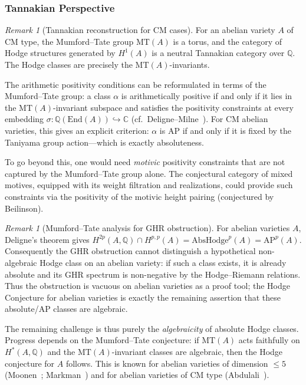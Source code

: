 \documentclass[aps,prd,twocolumn,superscriptaddress,nofootinbib]{revtex4-2}
\theoremstyle{definition}
\theoremstyle{remark}
\newtheorem{remark}[theorem]{Remark}
\begin{document}
\subsubsection{Tannakian Perspective}

\begin{remark}[Tannakian reconstruction for CM cases]
\label{rem:tannakian}
For an abelian variety $A$ of CM type, the Mumford--Tate group $\mathrm{MT}(A)$ is a torus, and the category of Hodge structures generated by $H^1(A)$ is a neutral Tannakian category over $\mathbb{Q}$. The Hodge classes are precisely the $\mathrm{MT}(A)$-invariants.

The arithmetic positivity conditions can be reformulated in terms of the Mumford--Tate group: a class $\alpha$ is arithmetically positive if and only if it lies in the $\mathrm{MT}(A)$-invariant subspace and satisfies the positivity constraints at every embedding $\sigma: \mathbb{Q}(\mathrm{End}(A)) \hookrightarrow \mathbb{C}$ (cf.\ Deligne--Milne~\cite{DeligneMilne1982}). For CM abelian varieties, this gives an explicit criterion: $\alpha$ is AP if and only if it is fixed by the Taniyama group action---which is exactly absoluteness.

To go beyond this, one would need \textit{motivic} positivity constraints that are not captured by the Mumford--Tate group alone. The conjectural category of mixed motives, equipped with its weight filtration and realizations, could provide such constraints via the positivity of the motivic height pairing (conjectured by Beilinson).
\end{remark}

\begin{remark}[Mumford--Tate analysis for GHR obstruction]
\label{rem:mumford-tate-ghr}
For abelian varieties $A$, Deligne's theorem gives
$H^{2p}(A,\mathbb{Q})\cap H^{p,p}(A)=\mathrm{AbsHodge}^p(A)=\mathrm{AP}^p(A)$.
Consequently the GHR obstruction cannot distinguish a hypothetical non-algebraic Hodge class on an abelian variety: if such a class exists, it is already absolute and its GHR spectrum is non-negative by the Hodge--Riemann relations. Thus the obstruction is vacuous on abelian varieties as a proof tool; the Hodge Conjecture for abelian varieties is exactly the remaining assertion that these absolute/AP classes are algebraic.

The remaining challenge is thus purely the \textit{algebraicity} of absolute Hodge classes. Progress depends on the Mumford--Tate conjecture: if $\mathrm{MT}(A)$ acts faithfully on $H^*(A, \mathbb{Q})$ and the $\mathrm{MT}(A)$-invariant classes are algebraic, then the Hodge conjecture for $A$ follows. This is known for abelian varieties of dimension $\leq 5$ (Moonen~\cite{Moonen1999}; Markman~\cite{Markman2025}) and for abelian varieties of CM type (Abdulali~\cite{Abdulali1994}).
\end{remark}
\end{document}
